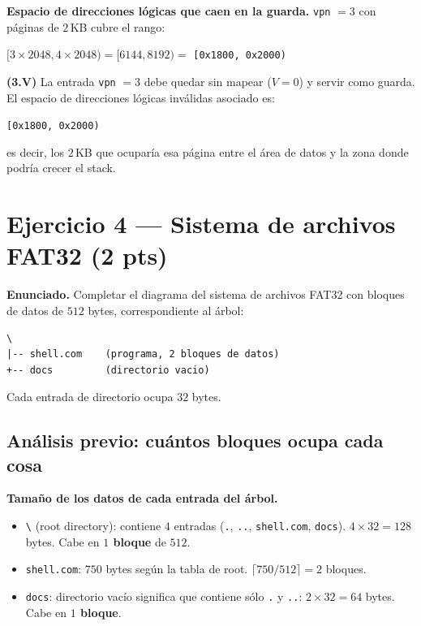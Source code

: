 \documentclass[11pt,a4paper]{article}
\begin{document}
\textbf{Espacio de direcciones lógicas que caen en la guarda.}
\texttt{vpn} $= 3$ con páginas de $2$\,KB cubre el rango:

\quad $[3 \times 2048, 4 \times 2048) = [6144, 8192) = $
\texttt{[0x1800, 0x2000)}

\begin{respuesta}
\textbf{(3.V)} La entrada \texttt{vpn} $= 3$ debe quedar sin mapear
($V = 0$) y servir como guarda. El espacio de direcciones lógicas
inválidas asociado es:

\begin{center}
\Large \texttt{[0x1800, 0x2000)}
\end{center}

\noindent es decir, los $2$\,KB que ocuparía esa página entre el área
de datos y la zona donde podría crecer el stack.
\end{respuesta}

\section{Ejercicio 4 --- Sistema de archivos FAT32 (2 pts)}

\textbf{Enunciado.} Completar el diagrama del sistema de archivos
FAT32 con bloques de datos de $512$ bytes, correspondiente al árbol:

\begin{lstlisting}[style=textstyle]
\
|-- shell.com    (programa, 2 bloques de datos)
+-- docs         (directorio vacio)
\end{lstlisting}

\noindent Cada entrada de directorio ocupa $32$ bytes.

\subsection*{Análisis previo: cuántos bloques ocupa cada cosa}

\textbf{Tamaño de los datos de cada entrada del árbol.}

\begin{itemize}[leftmargin=*]
    \item \texttt{\textbackslash} (root directory): contiene $4$
        entradas (\texttt{.}, \texttt{..}, \texttt{shell.com},
        \texttt{docs}). $4 \times 32 = 128$ bytes. Cabe en
        \textbf{$1$ bloque} de $512$.
    \item \texttt{shell.com}: $750$ bytes según la tabla de root.
        $\lceil 750 / 512 \rceil = 2$ bloques.
    \item \texttt{docs}: directorio vacío significa que contiene
        sólo \texttt{.} y \texttt{..}: $2 \times 32 = 64$ bytes.
        Cabe en \textbf{$1$ bloque}.
\end{itemize}
\end{document}
